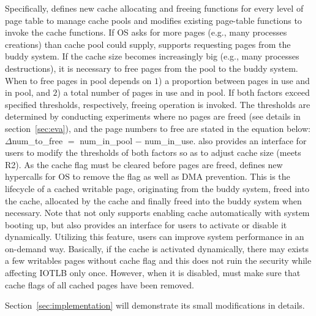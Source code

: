 Specifically, \name defines new cache allocating and freeing functions for every level of page table to manage cache pools and modifies existing page-table functions to invoke the cache functions. If OS asks for more pages (e.g., many processes creations) than cache pool could supply, \name supports requesting pages from the buddy system. If the cache size becomes increasingly big (e.g., many processes destructions), it is necessary to free pages from the pool to the buddy system. When to free pages in pool depends on $1$) a proportion between pages in use and in pool, and $2$) a total number of pages in use and in pool. If both factors exceed specified thresholds, respectively, freeing operation is invoked. The thresholds are determined by conducting experiments where no pages are freed (see details in section~\ref{sec:eva}), and the page numbers to free are stated in the equation below: $\Delta$num\_to\_free $=$ num\_in\_pool $-$ num\_in\_use. \name also provides an interface for users to modify the thresholds of both factors so as to adjust cache size (meets R2). As the cache flag must be cleared before pages are freed, \name defines new hypercalls for OS to remove the flag as well as DMA prevention. This is the lifecycle of a cached writable page, originating from the buddy system, freed into the cache, allocated by the cache and finally freed into the buddy system when necessary. Note that \name not only supports enabling cache automatically with system booting up, but also provides an interface for users to activate or disable it dynamically. Utilizing this feature, users can improve system performance in an on-demand way. Basically, if the cache is activated dynamically, there may exists a few writables pages without cache flag and this does not ruin the security while affecting IOTLB only once. However, when it is disabled, \name must make sure that cache flags of all cached pages have been removed.

Section~\ref{sec:implementation} will demonstrate its small modifications in details. 
